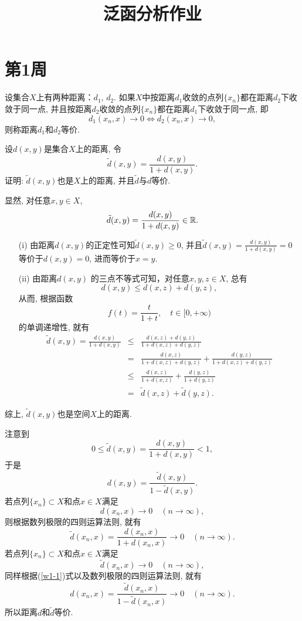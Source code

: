 \documentclass[UTF8,oneside,12pt]{article}  %
\makeatletter
\theoremstyle{DingLi1}
\numberwithin{equation}{section}
\newtheorem{definition}{\hskip 2em 定义}[section]
\theoremstyle{DingLi2}
\newtheorem{example}{\hskip 2em 问题}[section]
\renewenvironment{proof}[1][\proofname]{\par%
\pushQED{\qed}%
\normalfont \topsep6\p@\@plus6\p@\relax%
\trivlist%
\item[\hskip\labelsep%
#1]\ignorespaces%
}{%
\popQED\endtrivlist\@endpefalse%
}
\renewcommand{\proofname}{\heiti\large\color{blue} 证明}%
\makeatother
\begin{document}
\title{ 泛函分析作业}
\author{}
\date{}
\maketitle

\section{第1周}

\begin{definition}[等价距离] 设集合$X$上有两种距离：$d_1$, $d_2$. 如果$X$中按距离$d_1$收敛的点列$\{x_n\}$都在距离$d_2$下收敛于同一点, 并且按距离$d_2$收敛的点列$\{x_n\}$都在距离$d_1$下收敛于同一点, 即
$$d_1(x_n,x)\to 0 \Longleftrightarrow d_2(x_n,x)\to 0,$$
则称距离$d_1$和$d_2$等价.
\end{definition}

\begin{example}
设$d(x,y)$是集合$X$上的距离, 令
    $$\tilde{d}(x,y)=\frac{d(x,y)}{1+d(x,y)}.$$
    证明: $\tilde{d}(x,y)$也是$X$上的距离, 并且$\tilde{d}$与$d$等价.
\end{example}
\begin{proof}
显然, 对任意$x,y\in X$,
    $$\tilde{d}(x,y)=\frac{d(x,y)}{1+d(x,y)}\in \Bbb{R}.$$
    \begin{itemize}
      \item[(i)]由距离$d(x,y)$的正定性可知$\tilde{d}(x,y)\geq 0$, 并且$\tilde{d}(x,y)=\frac{d(x,y)}{1+d(x,y)}=0$等价于$d(x,y)=0$, 进而等价于$x=y$.
      \item[(ii)]由距离$d(x,y)$ 的三点不等式可知，对任意$x,y,z\in X$, 总有
          $$d(x,y)\leq d(x,z)+d(y,z),$$
          从而, 根据函数
    $$f(t)=\frac{t}{1+t},\quad t\in [0,+\infty)$$
    的单调递增性, 就有
    $$
    \begin{array}{rcl}
    \tilde{d}(x,y)=\frac{d(x,y)}{1+d(x,y)}&\leq&\frac{d(x,z)+d(y,z)}{1+d(x,z)+d(y,z)}\\
    &=&\frac{d(x,z)}{1+d(x,z)+d(y,z)}+\frac{d(y,z)}{1+d(x,z)+d(y,z)}\\
    &\leq&\frac{d(x,z)}{1+d(x,z)}+\frac{d(y,z)}{1+d(y,z)}\\
    &=&\tilde{d}(x,z) +\tilde{d}(y,z).
    \end{array}
    $$
    \end{itemize}
综上, $\tilde{d}(x,y)$也是空间$X$上的距离.

注意到
    $$0\leq \tilde{d}(x,y)=\frac{d(x,y)}{1+d(x,y)}<1,$$
于是
\begin{equation}\label{w1-1}
d(x,y) =\frac{\tilde{d}(x,y)}{1-\tilde{d}(x,y)}.
\end{equation}
若点列$\{x_n\}\subset X$和点$x\in X$满足
    $$d(x_n,x)\to 0 \quad (n\to \infty),$$
则根据数列极限的四则运算法则, 就有
    $$\tilde{d}(x_n,x)=\frac{d(x_n,x)}{1+d(x_n,x)}\to 0\quad (n\to\infty).$$
若点列$\{x_n\}\subset X$和点$x\in X$满足
    $$\tilde{d}(x_n,x)\to 0 \quad (n\to \infty),$$
同样根据(\ref{w1-1})式以及数列极限的四则运算法则, 就有
    $${d}(x_n,x)=\frac{\tilde{d}(x_n,x)}{1-\tilde{d}(x_n,x)}\to 0\quad (n\to\infty).$$
所以距离$d$和$\tilde{d}$等价.
\end{proof}
\end{document}
